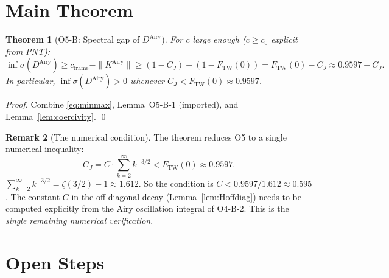 \documentclass[12pt,a4paper]{amsart}
\newtheorem{theorem}{Theorem}[section]
\theoremstyle{definition}
\newtheorem{remark}[theorem]{Remark}
\newcommand{\KAi}{K^{\mathrm{Airy}}}
\newcommand{\DAi}{D^{\mathrm{Airy}}}
\newcommand{\norm}[1]{\|#1\|}
\begin{document}
\section{Main Theorem}
\label{sec:main}

\begin{theorem}[O5-B: Spectral gap of $\DAi$]\label{thm:main}
For $c$ large enough ($c \ge c_0$ explicit from PNT):
\[
  \inf\sigma(\DAi)
  \ge c_{\mathrm{frame}} - \norm{\KAi}
  \ge (1 - C_J) - (1 - F_{\mathrm{TW}}(0))
  = F_{\mathrm{TW}}(0) - C_J
  \approx 0.9597 - C_J.
\]
In particular, $\inf\sigma(\DAi) > 0$ whenever $C_J < F_{\mathrm{TW}}(0) \approx 0.9597$.
\end{theorem}

\begin{proof}
Combine \eqref{eq:minmax}, Lemma~O5-B-1 (imported), and Lemma~\ref{lem:coercivity}. \qed
\end{proof}

\begin{remark}[The numerical condition]
The theorem reduces O5 to a single numerical inequality:
\[
  C_J = C \cdot \sum_{k=2}^{\infty} k^{-3/2} < F_{\mathrm{TW}}(0) \approx 0.9597.
\]
$\sum_{k=2}^\infty k^{-3/2} = \zeta(3/2) - 1 \approx 1.612$.
So the condition is $C < 0.9597/1.612 \approx 0.595$.
The constant $C$ in the off-diagonal decay (Lemma~\ref{lem:Hoffdiag})
needs to be computed explicitly from the Airy oscillation integral
of O4-B-2. This is the \emph{single remaining numerical verification}.
\end{remark}

\section{Open Steps}
\label{sec:open}
\end{document}
